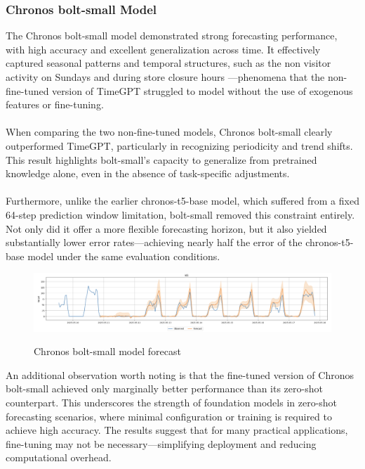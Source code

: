 \documentclass{article}
\begin{document}
\newpage
\subsubsection{Chronos bolt-small Model}
The Chronos bolt-small model demonstrated strong forecasting performance, with high accuracy and excellent generalization across time. It effectively captured seasonal patterns and temporal structures, such as the non visitor activity on Sundays and during store closure hours —phenomena that the non-fine-tuned version of TimeGPT struggled to model without the use of exogenous features or fine-tuning.\\
\\
When comparing the two non-fine-tuned models, Chronos bolt-small clearly outperformed TimeGPT, particularly in recognizing periodicity and trend shifts. This result highlights bolt-small’s capacity to generalize from pretrained knowledge alone, even in the absence of task-specific adjustments.\\
\\
Furthermore, unlike the earlier chronos-t5-base model, which suffered from a fixed 64-step prediction window limitation, bolt-small removed this constraint entirely. Not only did it offer a more flexible forecasting horizon, but it also yielded substantially lower error rates—achieving nearly half the error of the chronos-t5-base model under the same evaluation conditions.

\begin{figure}[h]
\includegraphics[width=1\linewidth]{images/chronos_notuned.png}
    \label{fig:mesh1}
    \caption{Chronos bolt-small model forecast}
\end{figure}

An additional observation worth noting is that the fine-tuned version of Chronos bolt-small achieved only marginally better performance than its zero-shot counterpart. This underscores the strength of foundation models in zero-shot forecasting scenarios, where minimal configuration or training is required to achieve high accuracy. The results suggest that for many practical applications, fine-tuning may not be necessary—simplifying deployment and reducing computational overhead. 
\end{document}
